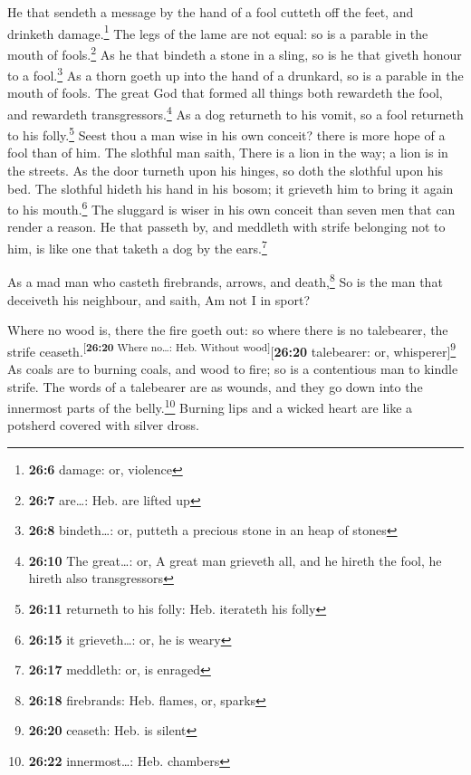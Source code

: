  He that sendeth a message by the hand of a fool cutteth
off the feet, and drinketh damage.\footnote{\textbf{26:6} damage: or,
  violence}  The legs of the lame are not equal: so is a
parable in the mouth of fools.\footnote{\textbf{26:7} are\ldots: Heb.
  are lifted up}  As he that bindeth a stone in a sling,
so is he that giveth honour to a fool.\footnote{\textbf{26:8}
  bindeth\ldots: or, putteth a precious stone in an heap of stones}
 As a thorn goeth up into the hand of a drunkard, so is a
parable in the mouth of fools.  The great God that formed
all things both rewardeth the fool, and rewardeth
transgressors.\footnote{\textbf{26:10} The great\ldots: or, A great man
  grieveth all, and he hireth the fool, he hireth also transgressors}
 As a dog returneth to his vomit, so a fool returneth to
his folly.\footnote{\textbf{26:11} returneth to his folly: Heb.
  iterateth his folly}  Seest thou a man wise in his own
conceit? there is more hope of a fool than of him.  The
slothful man saith, There is a lion in the way; a lion is in the
streets.  As the door turneth upon his hinges, so doth
the slothful upon his bed.  The slothful hideth his hand
in his bosom; it grieveth him to bring it again to his mouth.\footnote{\textbf{26:15}
  it grieveth\ldots: or, he is weary}  The sluggard is
wiser in his own conceit than seven men that can render a reason.
 He that passeth by, and meddleth with strife belonging
not to him, is like one that taketh a dog by the ears.\footnote{\textbf{26:17}
  meddleth: or, is enraged}

 As a mad man who casteth firebrands, arrows, and
death,\footnote{\textbf{26:18} firebrands: Heb. flames, or, sparks}
 So is the man that deceiveth his neighbour, and saith,
Am not I in sport?

 Where no wood is, there the fire goeth out: so where
there is no talebearer, the strife
ceaseth.\textsuperscript{{[}\textbf{26:20} Where no\ldots: Heb. Without
wood{]}}{[}\textbf{26:20} talebearer: or, whisperer{]}\footnote{\textbf{26:20}
  ceaseth: Heb. is silent}  As coals are to burning
coals, and wood to fire; so is a contentious man to kindle strife.
 The words of a talebearer are as wounds, and they go
down into the innermost parts of the belly.\footnote{\textbf{26:22}
  innermost\ldots: Heb. chambers}  Burning lips and a
wicked heart are like a potsherd covered with silver dross.

